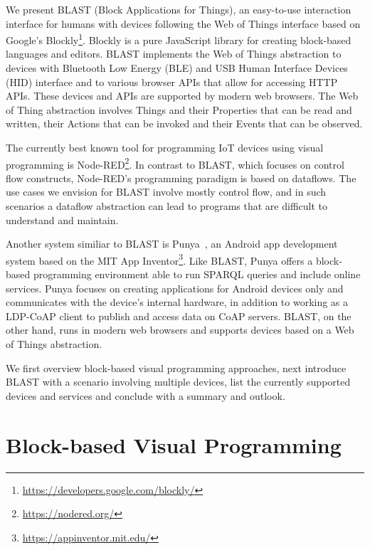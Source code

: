 \documentclass[runningheads]{llncs}
\begin{document}
We present BLAST (Block Applications for Things), an easy-to-use interaction interface for humans with devices following the Web of Things interface based on Google's Blockly\footnote{\url{https://developers.google.com/blockly/}}.
Blockly is a pure JavaScript library for creating block-based languages and editors.
BLAST implements the Web of Things abstraction to devices with Bluetooth Low Energy (BLE) and USB Human Interface Devices (HID) interface and to various browser APIs that allow for accessing HTTP APIs.
These devices and APIs are supported by modern web browsers.
The Web of Thing abstraction involves Things and their Properties that can be read and written, their Actions that can be invoked and their Events that can be observed.

The currently best known tool for programming IoT devices using visual programming is Node-RED\footnote{\url{https://nodered.org/}}.
In contrast to BLAST, which focuses on control flow constructs, Node-RED's programming paradigm is based on dataflows.
The use cases we envision for BLAST involve mostly control flow, and in such scenarios a dataflow abstraction can lead to programs that are difficult to understand and maintain.

Another system similiar to BLAST is Punya~\cite{patton2021punya}, an Android app development system based on the MIT App Inventor\footnote{\url{https://appinventor.mit.edu/}}.
Like BLAST, Punya offers a block-based programming environment able to run SPARQL queries and include online services.
Punya focuses on creating applications for Android devices only and communicates with the device's internal hardware, in addition to working as a LDP-CoAP client to publish and access data on CoAP servers.
BLAST, on the other hand, runs in modern web browsers and supports devices based on a Web of Things abstraction.

We first overview block-based visual programming approaches, next introduce BLAST with a scenario involving multiple devices, list the currently supported devices and services and conclude with a summary and outlook.

\section{Block-based Visual Programming}
\end{document}
